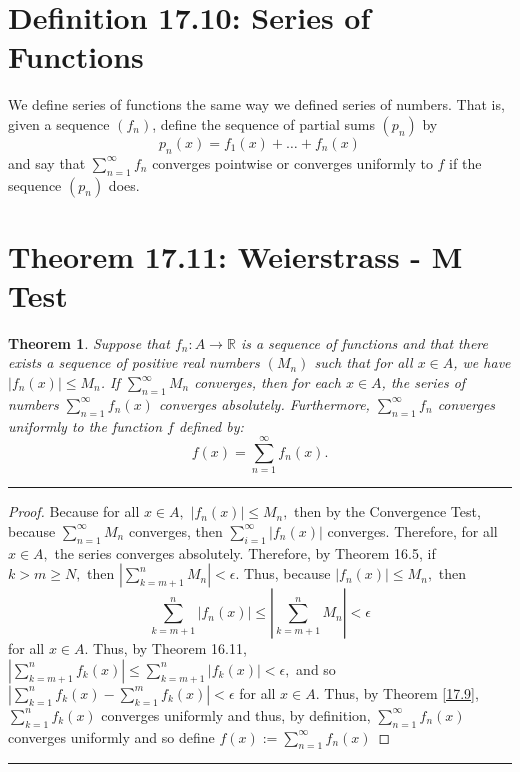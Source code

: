 \documentclass[openany, amssymb, psamsfonts]{amsart}
\newcommand{\bbR}{\mathbb{R}}
\newcommand{\abs}[1]{\lvert #1 \rvert}
\newtheorem{thm}{Theorem}[section]
\theoremstyle{definition}
\numberwithin{equation}{section}
\begin{document}
\section*{Definition 17.10: Series of Functions}
\begin{definition}
	We define series of functions the same way we defined series of numbers. That is, given a sequence $(f_n)$, define the sequence of partial sums $(p_n)$ by
	\[
		p_n(x) = f_1(x) + \dots + f_n(x)
	\]
	and say that $\sum\limits_{n = 1}^{\infty} f_n$ converges pointwise or converges uniformly to $f$ if the sequence $(p_n)$ does.
\end{definition}

\section*{Theorem 17.11: Weierstrass - M Test}
\begin{thm}\label{17.11}
	Suppose that $f_n\colon A \to \bbR$ is a sequence of functions and that there exists a sequence of positive real numbers $(M_n)$ such that for all $x \in A$, we have $\abs{f_n(x)} \leq M_n$.
	If $\sum\limits_{n = 1}^{\infty} M_n$ converges, then for each $x \in A$, the series of numbers $\sum\limits_{n = 1}^{\infty} f_n(x)$ converges absolutely. Furthermore, $\sum\limits_{n = 1}^{\infty} f_n$ converges uniformly to the function $f$ defined by:
	\[
		f(x) = \sum_{n = 1}^{\infty} f_n(x).
	\]
\end{thm}
\vspace{4pt}     \hrule   \vspace{4pt}\begin{proof}
    Because for all $x\in A,$ $|f_n(x)|\leq M_n,$ then by the Convergence Test, because $\displaystyle\sum_{n=1}^\infty M_n$ converges, then $\displaystyle\sum_{i=1}^\infty |f_n(x)|$ converges. Therefore, for all $x\in A,$ the series converges absolutely. Therefore, by Theorem 16.5, if $k>m \geq N,$ then $|\displaystyle\sum_{k=m+1}^n M_n|< \epsilon.$ Thus, because $|f_n(x)|\leq M_n,$ then \[\displaystyle\sum_{k=m+1}^n |f_n(x)|\leq  |\displaystyle\sum_{k=m+1}^n M_n| < \epsilon\] for all $x\in A.$ Thus, by Theorem 16.11, $|\displaystyle\sum_{k=m+1}^n f_k(x)|\leq \displaystyle\sum_{k=m+1}^n |f_k(x)| < \epsilon,$ and so $|\displaystyle\sum_{k=1}^nf_k(x) - \displaystyle\sum_{k=1}^mf_k(x)|<\epsilon$ for all $x\in A.$ Thus, by Theorem \ref{17.9}, $\displaystyle\sum_{k=1}^nf_k(x)$ converges uniformly and thus, by definition, $\displaystyle\sum_{n=1}^\infty f_n(x)$ converges uniformly and so define $f(x):=\displaystyle\sum_{n=1}^\infty f_n(x)$ 
\end{proof}\vspace{4pt}     \hrule   \vspace{4pt}
\end{document}

